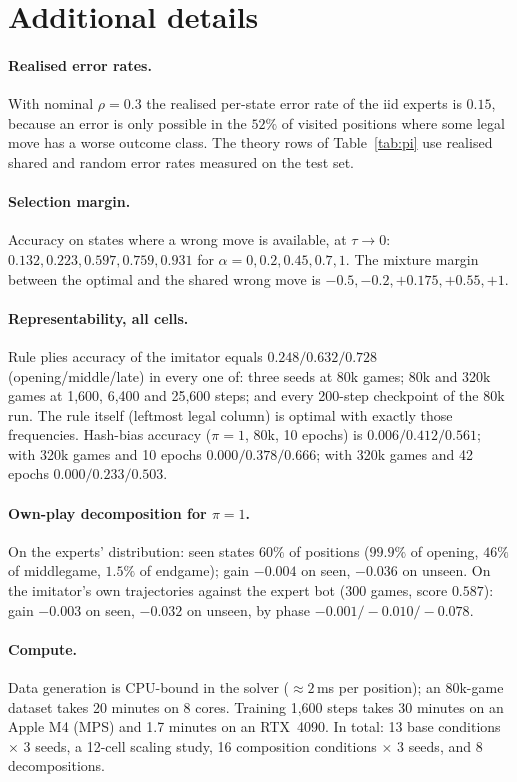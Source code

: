 \documentclass[11pt]{article}
\newcommand{\tauz}{\tau\!\to\!0}
\begin{document}
\appendix
\section{Additional details}

\paragraph{Realised error rates.} With nominal $\rho=0.3$ the realised per-state error rate of the iid experts is $0.15$, because an error is only possible in the $52\%$ of visited positions where some legal move has a worse outcome class. The theory rows of Table~\ref{tab:pi} use realised shared and random error rates measured on the test set.

\paragraph{Selection margin.} Accuracy on states where a wrong move is available, at $\tauz$: $0.132, 0.223, 0.597, 0.759, 0.931$ for $\alpha=0,0.2,0.45,0.7,1$. The mixture margin between the optimal and the shared wrong move is $-0.5,-0.2,+0.175,+0.55,+1$.

\paragraph{Representability, all cells.} Rule plies accuracy of the imitator equals $0.248/0.632/0.728$ (opening/middle/late) in every one of: three seeds at 80k games; 80k and 320k games at 1{,}600, 6{,}400 and 25{,}600 steps; and every 200-step checkpoint of the 80k run. The rule itself (leftmost legal column) is optimal with exactly those frequencies. Hash-bias accuracy ($\pi=1$, 80k, 10 epochs) is $0.006/0.412/0.561$; with 320k games and 10 epochs $0.000/0.378/0.666$; with 320k games and 42 epochs $0.000/0.233/0.503$.

\paragraph{Own-play decomposition for $\pi=1$.} On the experts' distribution: seen states $60\%$ of positions ($99.9\%$ of opening, $46\%$ of middlegame, $1.5\%$ of endgame); gain $-0.004$ on seen, $-0.036$ on unseen. On the imitator's own trajectories against the expert bot (300 games, score $0.587$): gain $-0.003$ on seen, $-0.032$ on unseen, by phase $-0.001/-0.010/-0.078$.

\paragraph{Compute.} Data generation is CPU-bound in the solver ($\approx 2$\,ms per position); an 80k-game dataset takes 20 minutes on 8 cores. Training 1{,}600 steps takes 30 minutes on an Apple M4 (MPS) and 1.7 minutes on an RTX~4090. In total: 13 base conditions $\times$ 3 seeds, a 12-cell scaling study, 16 composition conditions $\times$ 3 seeds, and 8 decompositions.
\end{document}
